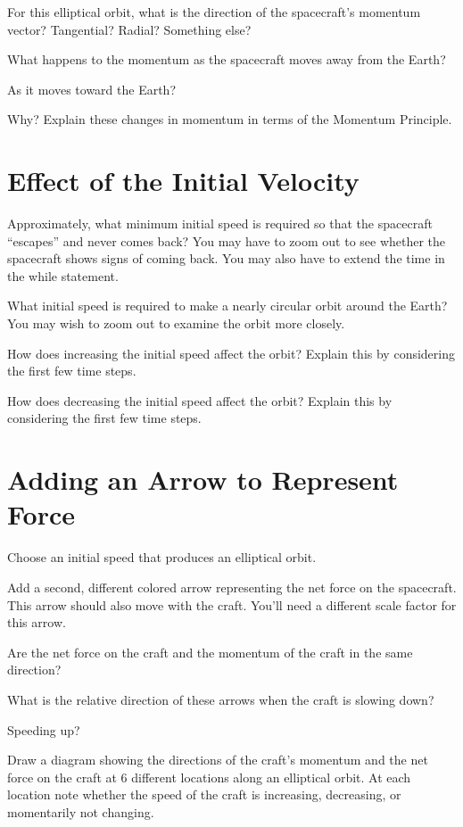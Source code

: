 \documentclass[10pt]{article}
\begin{document}
\begin{compactitem}[\color{MIRed}$\Rightarrow$]
\item For this elliptical orbit, what is the direction of the spacecraft's momentum vector? Tangential? Radial? Something else?
\item What happens to the momentum as the spacecraft moves away from the Earth?   
\item As it moves toward the Earth?
\item Why? Explain these changes in momentum in terms of the Momentum Principle.
\end{compactitem}


\section{Effect of the Initial Velocity}

\begin{compactitem}[\color{MIRed}$\Rightarrow$]
\item Approximately, what minimum initial speed is required so that the spacecraft ``escapes'' and never comes back? You may have to zoom out to see whether the spacecraft shows signs of coming back. You may also have to extend the time in the while statement.
\item What initial speed is required to make a nearly circular orbit around the Earth? You may wish to zoom out to examine the orbit more closely.   
\item How does increasing the initial speed affect the orbit? Explain this by considering the first few time steps.
\item How does decreasing the initial speed affect the orbit? Explain this by considering the first few time steps.
\end{compactitem}

\section{Adding an Arrow to Represent Force }

\begin{compactitem}[\color{MIRed}$\Rightarrow$]
\item Choose an initial speed that produces an elliptical orbit.
\item Add a second, different colored arrow representing the net force on the spacecraft.  This arrow should also move with the craft.  You'll need a different scale factor for this arrow.
\item Are the net force on the craft and the momentum of the craft in the same direction?
\item What is the relative direction of these arrows when the craft is slowing down?  
\item Speeding up?  
\item Draw a diagram showing the directions of the craft's momentum and the net force on the craft at 6 different locations along an elliptical orbit. At each location note whether the speed of the craft is increasing, decreasing, or momentarily not changing.
\end{compactitem}
\end{document}
